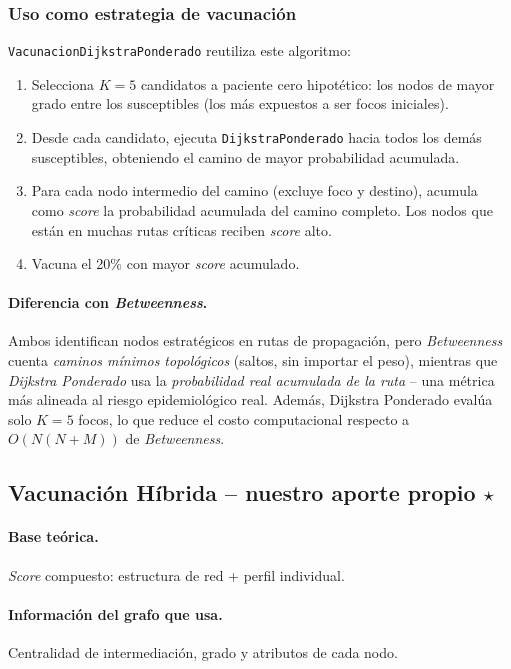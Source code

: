 \documentclass[spanish,notitlepage,letterpaper, 12pt]{article}
\begin{document}
\subsubsection{Uso como estrategia de vacunaci\'on}

\texttt{VacunacionDijkstraPonderado} reutiliza este algoritmo:

\begin{enumerate}
    \item Selecciona $K = 5$ candidatos a paciente cero hipot\'etico: los nodos de mayor grado entre los susceptibles (los m\'as expuestos a ser focos iniciales).
    \item Desde cada candidato, ejecuta \texttt{DijkstraPonderado} hacia todos los dem\'as susceptibles, obteniendo el camino de mayor probabilidad acumulada.
    \item Para cada nodo intermedio del camino (excluye foco y destino), acumula como \textit{score} la probabilidad acumulada del camino completo. Los nodos que est\'an en muchas rutas cr\'iticas reciben \textit{score} alto.
    \item Vacuna el 20\% con mayor \textit{score} acumulado.
\end{enumerate}

\paragraph{Diferencia con \textit{Betweenness}.} Ambos identifican nodos estrat\'egicos en rutas de propagaci\'on, pero \textit{Betweenness} cuenta \textit{caminos m\'inimos topol\'ogicos} (saltos, sin importar el peso), mientras que \textit{Dijkstra Ponderado} usa la \textit{probabilidad real acumulada de la ruta} -- una m\'etrica m\'as alineada al riesgo epidemiol\'ogico real. Adem\'as, Dijkstra Ponderado eval\'ua solo $K = 5$ focos, lo que reduce el costo computacional respecto a $O(N(N+M))$ de \textit{Betweenness}.

\subsection{Vacunaci\'on H\'ibrida -- nuestro aporte propio $\star$}
\label{sec:hibrida}

\paragraph{Base te\'orica.} \textit{Score} compuesto: estructura de red + perfil individual.

\paragraph{Informaci\'on del grafo que usa.} Centralidad de intermediaci\'on, grado y atributos de cada nodo.
\end{document}
